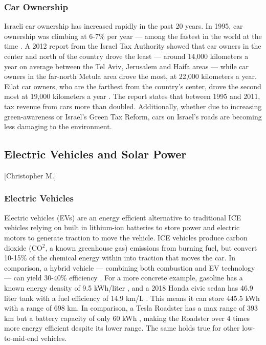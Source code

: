 \documentclass[12pt]{article}                         %
\begin{document}
\subsubsection{Car Ownership}
Israeli car ownership has increased rapidly in the past 20 years. In 1995, car ownership was climbing at 6-7\% per year --- among the fastest in the world at the time \cite{Slater1995IsraelCulture}. A 2012 report from the Israel Tax Authority showed that car owners in the center and north of the country drove the least --- around 14,000 kilometers a year on average between the Tel Aviv, Jerusalem and Haifa areas --- while car owners in the far-north Metula area drove the most, at 22,000 kilometers a year. Eilat car owners, who are the farthest from the country’s center, drove the second most at 19,000 kilometers a year \cite{Schmil2012WhatHow}. The report states that between 1995 and 2011, tax revenue from cars more than doubled. Additionally, whether due to increasing green-awareness or Israel’s Green Tax Reform, cars on Israel's roads are becoming less damaging to the environment\cite{Schmil2012WhatHow}.

\subsection{Electric Vehicles and Solar Power}[Christopher M.]
\subsubsection{Electric Vehicles}
Electric vehicles (EVs) are an energy efficient alternative to traditional ICE vehicles relying on built in lithium-ion batteries to store power and electric motors to generate traction to move the vehicle. ICE vehicles produce carbon dioxide (CO$^2$, a known greenhouse gas) emissions from burning fuel, but convert 10-15\% of the chemical energy within into traction that moves the car. In comparison, a hybrid vehicle --- combining both combustion and EV technology --- can yield 30-40\% efficiency \cite{Zhu2015DistributedGrid}. For a more concrete example, gasoline has a known energy density of 9.5 kWh/liter \cite{EngineeringFactors}, and a 2018 Honda civic sedan has 46.9 liter tank with a fuel efficiency of 14.9 km/L \cite{20182018Information}. This means it can store 445.5 kWh with a range of 698 km. In comparison, a Tesla Roadster has a max range of 393 km but a battery capacity of only 60 kWh \cite{Friel2010ManagementVehicles}, making the Roadster over 4 times more energy efficient despite its lower range. The same holds true for other low-to-mid-end vehicles.
\end{document}
